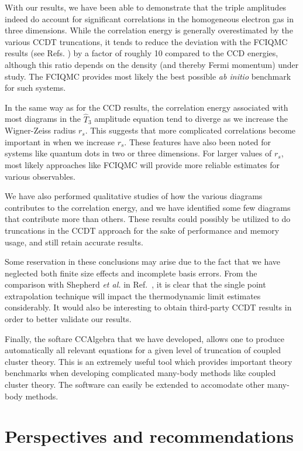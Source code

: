 With our results, we have been able to demonstrate that the triple
amplitudes indeed do account for significant correlations in the
homogeneous electron gas in three dimensions. While the correlation
energy is generally overestimated by the various CCDT truncations, it
tends to reduce the deviation with the FCIQMC results (see
Refs. \cite{Shepherd2012, Leikanger2013}) by a factor of roughly 10
compared to the CCD energies, although this ratio depends  on
the density (and thereby Fermi momentum) under study.  The FCIQMC provides most likely the best possible {\em ab initio} benchmark for such systems.

In the same way as for the CCD results, the correlation energy
associated with most diagrams in the $\hat{T}_3$ amplitude equation
tend to diverge as we increase the Wigner-Zeiss radius $r_s$. This suggests
that more complicated correlations become important in
when we increase $r_s$.  
These features have also been noted for systems like quantum dots in two or three dimensions.
For larger values of $r_s$, most likely approaches like FCIQMC will provide more reliable estimates for various observables.

We have also performed qualitative studies of how the various
diagrams contributes to the correlation energy, and we have identified
some few diagrams that contribute more than others. These results
could possibly be utilized to do truncations in the CCDT approach for the sake
of performance and memory usage, and still retain accurate results.

Some reservation in these conclusions may arise due to the fact that
we have neglected both finite size effects and incomplete basis
errors. From the comparison with Shepherd \emph{et al.} in
Ref.~\cite{Shepherd2013}, it is clear that the single point
extrapolation technique will impact the thermodynamic limit estimates
considerably. It would also be interesting to obtain third-party
CCDT results in order to better validate our results. 

Finally, the softare CCAlgebra that we have developed, allows one to
produce automatically all relevant equations for a given level of
truncation of coupled cluster theory. This is an extremely useful tool
which provides important theory benchmarks when developing complicated
many-body methods like coupled cluster theory.
The software can easily be extended to accomodate other many-body methods. 
\section{Perspectives and recommendations}

